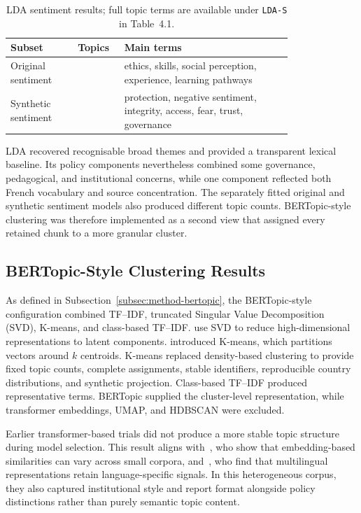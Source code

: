 \begin{table}[!htbp]
\centering
\small
\begin{tabular}{
  >{\raggedright\arraybackslash}p{0.2\linewidth}
  >{\centering\arraybackslash}p{0.1\linewidth}
  >{\raggedright\arraybackslash}p{0.5\linewidth}}
\hline
Subset & Topics & Main terms \\
\hline
Original sentiment & 3 & ethics, skills, social perception, experience, learning
pathways \\
Synthetic sentiment & 4 & protection, negative sentiment, integrity, access, fear,
trust, governance \\
\hline
\end{tabular}
\caption{LDA sentiment results; full topic terms are available under \texttt{LDA-S} in Table~4.1.}
\label{tab:impl-lda-sentiment-comparison}
\end{table}


LDA recovered recognisable broad themes and provided a transparent lexical
baseline. Its policy components nevertheless combined some governance,
pedagogical, and institutional concerns, while one component reflected both French
vocabulary and source concentration. The separately fitted original and synthetic
sentiment models also produced different topic counts. BERTopic-style clustering was
therefore implemented as a second view that assigned every retained chunk to a more
granular cluster.

\subsection{BERTopic-Style Clustering Results}
\label{subsec:impl-bertopic}

As defined in Subsection~\ref{subsec:method-bertopic}, the BERTopic-style
configuration combined TF--IDF, truncated Singular Value Decomposition (SVD),
K-means, and class-based TF--IDF. \cite{deerwester1990indexing} use SVD to reduce
high-dimensional representations to latent components. \cite{macqueen1967methods}
introduced K-means, which partitions vectors around $k$ centroids. K-means replaced
density-based clustering to provide fixed topic counts, complete assignments, stable
identifiers, reproducible country distributions, and synthetic projection.
Class-based TF--IDF produced representative terms. BERTopic supplied the
cluster-level representation, while transformer embeddings, UMAP, and HDBSCAN were
excluded.

Earlier transformer-based trials did not produce a more stable topic structure during
model selection. This result aligns with~\cite{antoniak2018evaluating}, who show that
embedding-based similarities can vary across small corpora,
and~\cite{yang2021language}, who find that multilingual representations retain
language-specific signals. In this heterogeneous corpus, they also captured
institutional style and report format alongside policy distinctions rather than
purely semantic topic content.

